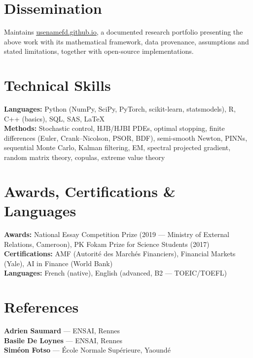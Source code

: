 \section{Dissemination}
\begin{itemize}[leftmargin=0.15in, label={}]
  \small{\item{
    Maintains \href{https://usenamefd.github.io/}{\underline{usenamefd.github.io}}, a documented research portfolio presenting the above work with its
    mathematical framework, data provenance, assumptions and stated limitations, together with open-source implementations.
  }}
\end{itemize}

\section{Technical Skills}
\begin{itemize}[leftmargin=0.15in, label={}]
  \small{\item{
    \textbf{Languages:} Python (NumPy, SciPy, PyTorch, scikit-learn, statsmodels), R, C++ (basics), SQL, SAS, \LaTeX \\
    \textbf{Methods:} Stochastic control, HJB/HJBI PDEs, optimal stopping, finite differences (Euler, Crank--Nicolson, PSOR, BDF), semi-smooth Newton, PINNs, sequential Monte Carlo, Kalman filtering, EM, spectral projected gradient, random matrix theory, copulas, extreme value theory
  }}
\end{itemize}

\section{Awards, Certifications \& Languages}
\begin{itemize}[leftmargin=0.15in, label={}]
  \small{\item{
    \textbf{Awards:} National Essay Competition Prize (2019 --- Ministry of External Relations, Cameroon), PK Fokam Prize for Science Students (2017) \\
    \textbf{Certifications:} AMF (Autorit\'e des March\'es Financiers), Financial Markets (Yale), AI in Finance (World Bank) \\
    \textbf{Languages:} French (native), English (advanced, B2 --- TOEIC/TOEFL)
  }}
\end{itemize}

\section{References}
\begin{itemize}[leftmargin=0.15in, label={}]
  \small{\item{
    \textbf{Adrien Saumard} --- ENSAI, Rennes \\
    \textbf{Basile De Loynes} --- ENSAI, Rennes \\
    \textbf{Sim\'eon Fotso} --- \'Ecole Normale Sup\'erieure, Yaound\'e
  }}
\end{itemize}


